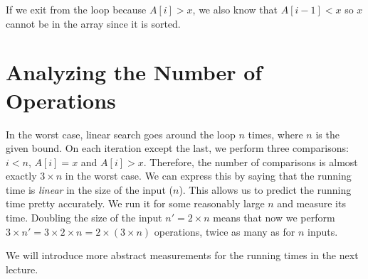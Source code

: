 If we exit from the loop because $A[i] > x$, we also know that $A[i-1]
< x$ so $x$ cannot be in the array since it is sorted.


\section{Analyzing the Number of Operations}
\label{sec:linsearch:complexity}

In the worst case, linear search goes around the loop $n$ times, where
$n$ is the given bound.  On each iteration except the last, we perform
three comparisons: $i < n$, $A[i] = x$ and $A[i] > x$.  Therefore, the
number of comparisons is almost exactly $3 \times n$ in the worst
case.  We can express this by saying that the running time is
\emph{linear} in the size of the input ($n$).  This allows us to
predict the running time pretty accurately.  We run it for some
reasonably large $n$ and measure its time.  Doubling the size of the
input $n' = 2 \times n$ means that now we perform $3 \times n' = 3
\times 2 \times n = 2 \times (3 \times n)$ operations, twice as many
as for $n$ inputs.

We will introduce more abstract measurements for the running times
in the next lecture.


% 
% 
